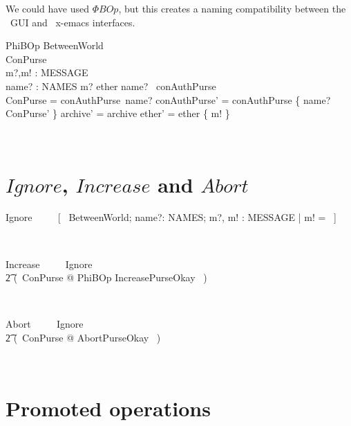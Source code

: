 We could have used $\Phi BOp$, but this creates a naming compatibility
between the \zeves\ GUI and \zeves\ x-emacs interfaces.
%
\begin{LSDef}
\begin{schema}{PhiBOp}
  \Delta BetweenWorld
  \\    \Delta ConPurse
  \\    m?,m! : MESSAGE
  \\    name? : NAMES
  \where
  m? \in ether
  \also
  name? \in \dom~conAuthPurse
  \\    \theta ConPurse = conAuthPurse~name?
  \also
  conAuthPurse' = conAuthPurse \oplus \{ name? \mapsto \theta ConPurse' \}
  \also
  archive' = archive
  \also
  ether' = ether \cup \{ m! \}
\end{schema}~\end{LSDef}

\section{$Ignore$, $Increase$ and $Abort$}\label{ch5.ignore.increase.abort}

\begin{LSDef}
\begin{zed}
  Ignore ~~~~ [~ \Xi BetweenWorld; name?: NAMES; m?, m! : MESSAGE | m! = \bot ~]
\end{zed}~\end{LSDef}

\begin{LSDef}
\begin{zed}
  Increase ~~~~ Ignore
  \\ \t2                \lor (~\exists \Delta ConPurse @
  PhiBOp \land IncreasePurseOkay ~)
\end{zed}~\end{LSDef}

\begin{LSDef}
\begin{zed}
  Abort ~~~~ Ignore
  \\ \t2                \lor (~\exists \Delta ConPurse @
  AbortPurseOkay \land [~ PhiBOp | m! = \bot ~]~)
\end{zed}~\end{LSDef}

\section{Promoted operations}\label{ch5.promoted}

